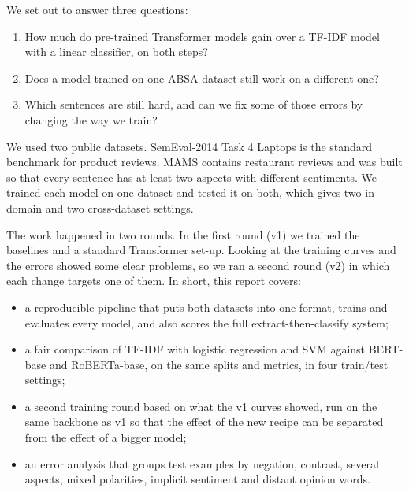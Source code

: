 \documentclass[11pt]{article}
\begin{document}
We set out to answer three questions:

\begin{enumerate}
\setlength\itemsep{0em}
\item How much do pre-trained Transformer models gain over a TF-IDF model with a linear classifier, on both steps?
\item Does a model trained on one ABSA dataset still work on a different one?
\item Which sentences are still hard, and can we fix some of those errors by changing the way we train?
\end{enumerate}

We used two public datasets. SemEval-2014 Task 4 Laptops \citep{pontiki2014semeval} is the standard benchmark for product reviews. MAMS \citep{jiang2019mams} contains restaurant reviews and was built so that every sentence has at least two aspects with different sentiments. We trained each model on one dataset and tested it on both, which gives two in-domain and two cross-dataset settings.

The work happened in two rounds. In the first round (v1) we trained the baselines and a standard Transformer set-up. Looking at the training curves and the errors showed some clear problems, so we ran a second round (v2) in which each change targets one of them. In short, this report covers:

\begin{itemize}
\setlength\itemsep{0em}
\item a reproducible pipeline that puts both datasets into one format, trains and evaluates every model, and also scores the full extract-then-classify system;
\item a fair comparison of TF-IDF with logistic regression and SVM against BERT-base and RoBERTa-base, on the same splits and metrics, in four train/test settings;
\item a second training round based on what the v1 curves showed, run on the same backbone as v1 so that the effect of the new recipe can be separated from the effect of a bigger model;
\item an error analysis that groups test examples by negation, contrast, several aspects, mixed polarities, implicit sentiment and distant opinion words.
\end{itemize}
\end{document}
